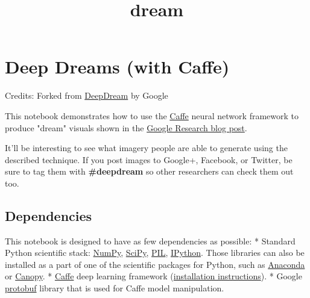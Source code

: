 \documentclass[11pt]{article}
\title{dream}
\begin{document}
    
    
    \maketitle
    
    

    
    \section{Deep Dreams (with Caffe)}\label{deep-dreams-with-caffe}

Credits: Forked from
\href{https://github.com/google/deepdream}{DeepDream} by Google

This notebook demonstrates how to use the
\href{http://caffe.berkeleyvision.org/}{Caffe} neural network framework
to produce "dream" visuals shown in the
\href{http://googleresearch.blogspot.ch/2015/06/inceptionism-going-deeper-into-neural.html}{Google
Research blog post}.

It'll be interesting to see what imagery people are able to generate
using the described technique. If you post images to Google+, Facebook,
or Twitter, be sure to tag them with \textbf{\#deepdream} so other
researchers can check them out too.

\subsection{Dependencies}\label{dependencies}

This notebook is designed to have as few dependencies as possible: *
Standard Python scientific stack: \href{http://www.numpy.org/}{NumPy},
\href{http://www.scipy.org/}{SciPy},
\href{http://www.pythonware.com/products/pil/}{PIL},
\href{http://ipython.org/}{IPython}. Those libraries can also be
installed as a part of one of the scientific packages for Python, such
as \href{http://continuum.io/downloads}{Anaconda} or
\href{https://store.enthought.com/}{Canopy}. *
\href{http://caffe.berkeleyvision.org/}{Caffe} deep learning framework
(\href{http://caffe.berkeleyvision.org/installation.html}{installation
instructions}). * Google
\href{https://developers.google.com/protocol-buffers/}{protobuf} library
that is used for Caffe model manipulation.
\end{document}
